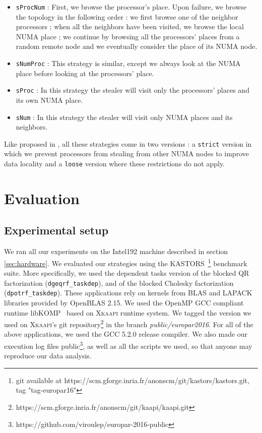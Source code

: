 \documentclass{Styles/llncs}
\newcommand{\kaapi}{\textsc{\mbox{Xkaapi}}\xspace}
\begin{document}
\begin{itemize}
  \item \verb/sProcNum/ : First, we browse the processor's place. Upon failure, we browse the topology in the following order : we first browse one of the neighbor processors ; when all the neighbors have been visited, we browse the local NUMA place ; we continue by browsing all the processors' places from a random remote node and we eventually consider the place of its NUMA node.
  \item \verb/sNumProc/ : This strategy is similar, except we always look at the
    NUMA place before looking at the processors' place.
  \item \verb/sProc/ : In this strategy the stealer will visit only the
    processors' places and its own NUMA place.
  \item \verb/sNum/ : In this strategy the stealer will visit only NUMA places
    and its neighbors. 
\end{itemize}

Like proposed in \cite{Olivier:2012:CMW:2388996.2389085}, all these strategies come in two versions : a \verb!strict! version in which we prevent processors from stealing from other NUMA nodes to improve data locality and a \verb!loose! version where these restrictions do not apply.


\section{Evaluation}
\label{sec:performances-evaluation}

\subsection{Experimental setup}

We ran all our experiments on the Intel192 machine described in section \ref{sec:hardware}.
We evaluated our strategies using the KASTORS~\cite{virouleau:hal-01081974}\footnote{git available at https://scm.gforge.inria.fr/anonscm/git/kastors/kastors.git, tag "tag-europar16"} benchmark suite.
More specifically, we used the dependent tasks version of the blocked QR factorization
(\verb/dgeqrf_taskdep/), and of the blocked Cholesky factorization (\verb/dpotrf_taskdep/).
These applications rely on kernels from BLAS and LAPACK libraries provided by OpenBLAS 2.15.
We used the OpenMP GCC compliant runtime libKOMP~\cite{libkomp} based on \kaapi runtime system. We tagged the version we used on \kaapi's
git repository\footnote{https://scm.gforge.inria.fr/anonscm/git/kaapi/kaapi.git } in the branch \emph{public/europar2016}.
For all of the above applications, we used the GCC 5.2.0 release compiler.
We also made our execution log files public\footnote{https://github.com/viroulep/europar-2016-public}, as well as all the scripts we used, so that
anyone may reproduce our data analysis.
\end{document}
